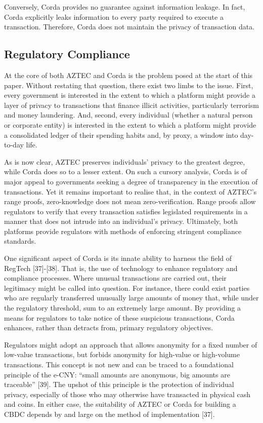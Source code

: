 Conversely, Corda provides no guarantee against information leakage. In fact, Corda explicitly leaks information to every party required to execute a transaction. Therefore, Corda does not maintain the privacy of transaction data.

\subsection{Regulatory Compliance}

At the core of both AZTEC and Corda is the problem posed at the start of this paper. Without restating that question, there exist two limbs to the issue. First, every government is interested in the extent to which a platform might provide a layer of privacy to transactions that finance illicit activities, particularly terrorism and money laundering. And, second, every individual (whether a natural person or corporate entity) is interested in the extent to which a platform might provide a consolidated ledger of their spending habits and, by proxy, a window into day-to-day life.

As is now clear, AZTEC preserves individuals' privacy to the greatest degree, while Corda does so to a lesser extent. On such a cursory analysis, Corda is of major appeal to governments seeking a degree of transparency in the execution of transactions. Yet it remains important to realise that, in the context of AZTEC's range proofs, zero-knowledge does not mean zero-verification. Range proofs allow regulators to verify that every transaction satisfies legislated requirements in a manner that does not intrude into an individual's privacy. Ultimately, both platforms provide regulators with methods of enforcing stringent compliance standards.

One significant aspect of Corda is its innate ability to harness the field of RegTech [37]-[38]. That is, the use of technology to enhance regulatory and compliance processes. Where unusual transactions are carried out, their legitimacy might be called into question. For instance, there could exist parties who are regularly transferred unusually large amounts of money that, while under the regulatory threshold, sum to an extremely large amount. By providing a means for regulators to take notice of these suspicious transactions, Corda enhances, rather than detracts from, primary regulatory objectives.

Regulators might adopt an approach that allows anonymity for a fixed number of low-value transactions, but forbids anonymity for high-value or high-volume transactions. This concept is not new and can be traced to a foundational principle of the e-CNY: ``small amounts are anonymous, big amounts are traceable'' [39]. The upshot of this principle is the protection of individual privacy, especially of those who may otherwise have transacted in physical cash and coins. In either case, the suitability of AZTEC or Corda for building a CBDC depends by and large on the method of implementation [37].
